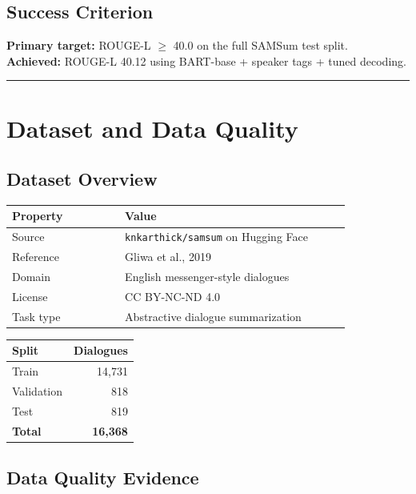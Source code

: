 \documentclass[11pt,a4paper]{article}
\newcommand{\sectionrule}{\vspace{6pt}\hrule\vspace{10pt}}
\begin{document}
\subsection{Success Criterion}

\textbf{Primary target:} ROUGE-L $\geq$ 40.0 on the full SAMSum test split.\\
\textbf{Achieved:} ROUGE-L 40.12 using BART-base + speaker tags + tuned decoding.

\sectionrule

\section{Dataset and Data Quality}

\subsection{Dataset Overview}

\begin{center}
\begin{tabular}{p{0.28\linewidth}p{0.56\linewidth}}
\toprule
\textbf{Property} & \textbf{Value} \\
\midrule
Source & \texttt{knkarthick/samsum} on Hugging Face \\
Reference & Gliwa et al., 2019 \\
Domain & English messenger-style dialogues \\
License & CC BY-NC-ND 4.0 \\
Task type & Abstractive dialogue summarization \\
\bottomrule
\end{tabular}
\end{center}

\begin{center}
\begin{tabular}{lr}
\toprule
Split & Dialogues \\
\midrule
Train & 14,731 \\
Validation & 818 \\
Test & 819 \\
\textbf{Total} & \textbf{16,368} \\
\bottomrule
\end{tabular}
\end{center}

\subsection{Data Quality Evidence}
\end{document}
